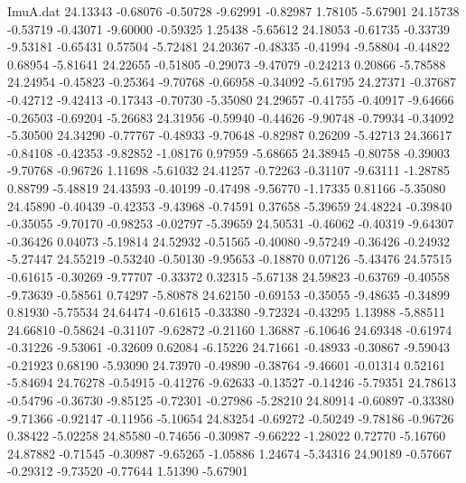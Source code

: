 \begin{filecontents}{ImuA.dat}
  24.13343   -0.68076   -0.50728   -9.62991   -0.82987    1.78105   -5.67901
  24.15738   -0.53719   -0.43071   -9.60000   -0.59325    1.25438   -5.65612
  24.18053   -0.61735   -0.33739   -9.53181   -0.65431    0.57504   -5.72481
  24.20367   -0.48335   -0.41994   -9.58804   -0.44822    0.68954   -5.81641
  24.22655   -0.51805   -0.29073   -9.47079   -0.24213    0.20866   -5.78588
  24.24954   -0.45823   -0.25364   -9.70768   -0.66958   -0.34092   -5.61795
  24.27371   -0.37687   -0.42712   -9.42413   -0.17343   -0.70730   -5.35080
  24.29657   -0.41755   -0.40917   -9.64666   -0.26503   -0.69204   -5.26683
  24.31956   -0.59940   -0.44626   -9.90748   -0.79934   -0.34092   -5.30500
  24.34290   -0.77767   -0.48933   -9.70648   -0.82987    0.26209   -5.42713
  24.36617   -0.84108   -0.42353   -9.82852   -1.08176    0.97959   -5.68665
  24.38945   -0.80758   -0.39003   -9.70768   -0.96726    1.11698   -5.61032
  24.41257   -0.72263   -0.31107   -9.63111   -1.28785    0.88799   -5.48819
  24.43593   -0.40199   -0.47498   -9.56770   -1.17335    0.81166   -5.35080
  24.45890   -0.40439   -0.42353   -9.43968   -0.74591    0.37658   -5.39659
  24.48224   -0.39840   -0.35055   -9.70170   -0.98253   -0.02797   -5.39659
  24.50531   -0.46062   -0.40319   -9.64307   -0.36426    0.04073   -5.19814
  24.52932   -0.51565   -0.40080   -9.57249   -0.36426   -0.24932   -5.27447
  24.55219   -0.53240   -0.50130   -9.95653   -0.18870    0.07126   -5.43476
  24.57515   -0.61615   -0.30269   -9.77707   -0.33372    0.32315   -5.67138
  24.59823   -0.63769   -0.40558   -9.73639   -0.58561    0.74297   -5.80878
  24.62150   -0.69153   -0.35055   -9.48635   -0.34899    0.81930   -5.75534
  24.64474   -0.61615   -0.33380   -9.72324   -0.43295    1.13988   -5.88511
  24.66810   -0.58624   -0.31107   -9.62872   -0.21160    1.36887   -6.10646
  24.69348   -0.61974   -0.31226   -9.53061   -0.32609    0.62084   -6.15226
  24.71661   -0.48933   -0.30867   -9.59043   -0.21923    0.68190   -5.93090
  24.73970   -0.49890   -0.38764   -9.46601   -0.01314    0.52161   -5.84694
  24.76278   -0.54915   -0.41276   -9.62633   -0.13527   -0.14246   -5.79351
  24.78613   -0.54796   -0.36730   -9.85125   -0.72301   -0.27986   -5.28210
  24.80914   -0.60897   -0.33380   -9.71366   -0.92147   -0.11956   -5.10654
  24.83254   -0.69272   -0.50249   -9.78186   -0.96726    0.38422   -5.02258
  24.85580   -0.74656   -0.30987   -9.66222   -1.28022    0.72770   -5.16760
  24.87882   -0.71545   -0.30987   -9.65265   -1.05886    1.24674   -5.34316
  24.90189   -0.57667   -0.29312   -9.73520   -0.77644    1.51390   -5.67901

\end{filecontents}
